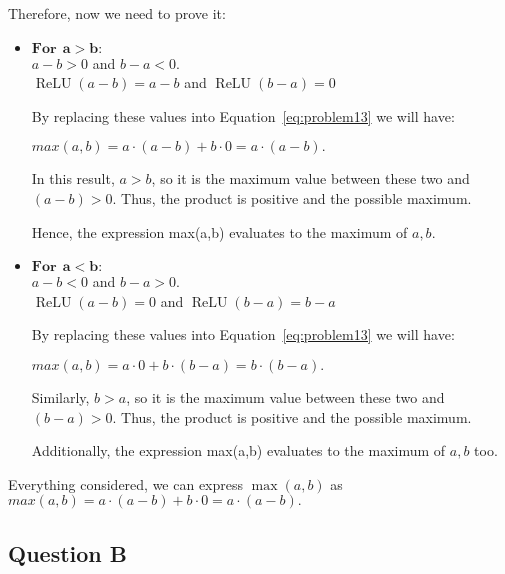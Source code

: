 Therefore, now we need to prove it: 
\begin{itemize}
	\item $\bm{For\ \ a > b:}$\\
	$a - b > 0 $ and $b - a < 0$.\\
	$\operatorname{ReLU}(a - b) = a - b$ and  $\operatorname{ReLU}(b - a) = 0$
	\vspace{1mm}
	
	By replacing these values into Equation~\ref{eq:problem13} we will have:
	
	$max(a,b) = a\cdot(a-b) + b\cdot0 = a\cdot(a-b).$
	\vspace{1mm}
	
	In this result, $a > b$, so it is the maximum value between these two and $(a - b) > 0$. Thus, the product is positive and the possible maximum.
	\vspace{1mm}
	
	Hence, the expression max(a,b) evaluates to the maximum of $a,b$.
	
	\item $\bm{For\ \ a < b:}$\\
	$a - b < 0 $ and $b - a > 0$.\\
	$\operatorname{ReLU}(a - b) = 0$ and  $\operatorname{ReLU}(b - a) = b - a$
	\vspace{1mm}
	
	By replacing these values into Equation~\ref{eq:problem13} we will have:
	
	$max(a,b) = a\cdot0 + b\cdot(b-a) = b\cdot(b-a).$
	\vspace{1mm}
	
	Similarly, $b > a$, so it is the maximum value between these two and $(b - a) > 0$. Thus, the product is positive and the possible maximum.
	\vspace{1mm}
	
	Additionally, the expression max(a,b) evaluates to the maximum of $a,b$ too.
\end{itemize}
Everything considered, we can express $\max(a,b)$ as $max(a,b) = a\cdot(a-b) + b\cdot0 = a\cdot(a-b).$
\vspace{3mm}

\subsection{Question B}


